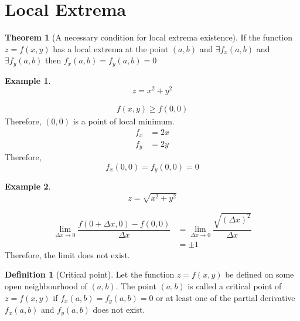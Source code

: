 \documentclass[fleqn, a4paper, 12pt, twoside]{article}
\theoremstyle{definition}
\newtheorem{example}{Example}
\newtheorem{definition}{Definition}
\theoremstyle{theorem}
\newtheorem{theorem}{Theorem}
\begin{document}
{\section{Local Extrema}

\begin{theorem}[A necessary condition for local extrema existence]
	If the function $z = f(x, y)$ has a local extrema at the point $(a, b)$ and $\exists f_x (a, b)$ and $\exists f_y (a, b)$ then $f_x (a, b) = f_y (a, b) = 0$
\end{theorem}

\begin{example}
	\begin{equation*}
		z = x^2 + y^2
	\end{equation*}
\end{example}

\begin{solution}
	\begin{align*}
		f(x, y) \geq f(0, 0)
	\end{align*}
	Therefore, $(0,0)$ is a point of local minimum.
	\begin{align*}
		f_x & = 2x \\
		f_y & = 2y
	\end{align*}
	Therefore,
	\begin{equation*}
		f_x(0,0) = f_y(0,0) = 0
	\end{equation*}
\end{solution}

\begin{example}
	\begin{equation*}
		z = \sqrt{x^2 + y^2}
	\end{equation*}
\end{example}

\begin{solution}
	\begin{align*}
		\lim\limits_{\Delta x \to 0} \dfrac{f(0 + \Delta x, 0) - f(0, 0)}{\Delta x} & = \lim\limits_{\Delta x \to 0} \dfrac{\sqrt{(\Delta x)^2}}{\Delta x} \\
                                                                                            & = \pm 1
	\end{align*}
	Therefore, the limit does not exist.
\end{solution}

\begin{definition}[Critical point]
	Let the function $z = f(x, y)$ be defined on some open neighbourhood of $(a, b)$. The point $(a, b)$ is called a critical point of $z = f(x, y)$ if $f_x(a, b) = f_y(a, b) = 0$ or at least one of the partial derivative $f_x(a, b)$ and $f_y(a, b)$ does not exist.
\end{definition}

}
\end{document}
